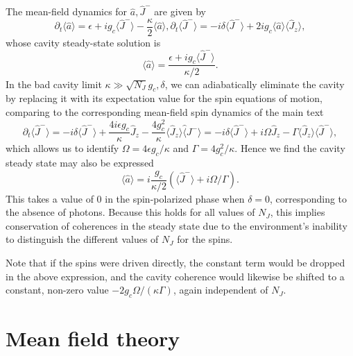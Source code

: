 The mean-field dynamics for $\hat a, \hat J^-$ are given by
\begin{subequations}
\begin{equation}
    \partial_t \langle \hat a \rangle  =  \epsilon + i g_c \langle \hat J^-\rangle  - \frac{\kappa}{2} \langle \hat a\rangle,
\end{equation}
\begin{equation}
    \partial_t \langle \hat J^- \rangle = - i \delta \langle \hat J^- \rangle + 2i g_c \langle \hat a \rangle \langle \hat J_z \rangle,
\end{equation}
\end{subequations}
whose cavity steady-state solution is 
\begin{equation}
     \langle \hat a\rangle = \frac{\epsilon + i g_c \langle \hat J^- \rangle}{\kappa/2}.
\end{equation}
In the bad cavity limit $\kappa \gg \sqrt{N_J}g_c, \delta$, we can adiabatically eliminate the cavity by replacing it with its expectation value for the spin equations of motion, comparing to the corresponding mean-field spin dynamics of the main text
\begin{equation}
    \partial_t \langle \hat J^- \rangle = - i \delta \langle \hat J^- \rangle + \frac{4 i \epsilon g_c}{\kappa} \hat J_z - \frac{4 g_c^2}{\kappa} \langle \hat J_z \rangle \hat \langle J^- \rangle = - i \delta \langle \hat J^- \rangle + i \Omega \hat J_z - \Gamma \langle \hat J_z \rangle \langle \hat J^- \rangle, 
\end{equation}
which allows us to identify $\Omega = 4 \epsilon g_c/\kappa$ and $\Gamma = 4g_c^2/\kappa$. Hence we find the cavity steady state may also be expressed
\begin{equation}
\label{eq:aMF}
    \langle \hat a \rangle = i \frac{g_c}{\kappa/2}(\langle \hat J^-\rangle + i\Omega/\Gamma).
\end{equation}
This takes a value of 0 in the spin-polarized phase when $\delta = 0$, corresponding to the absence of photons. Because this holds for all values of $N_J$, this implies conservation of coherences in the steady state due to the environment's inability to distinguish the different values of $N_J$ for the spins.

Note that if the spins were driven directly, the constant term would be dropped in the above expression, and the cavity coherence would likewise be shifted to a constant, non-zero value $-2 g_c \Omega/(\kappa \Gamma)$, again independent of $N_J$. 

\section{Mean field theory}
\label{sec:MFT}

